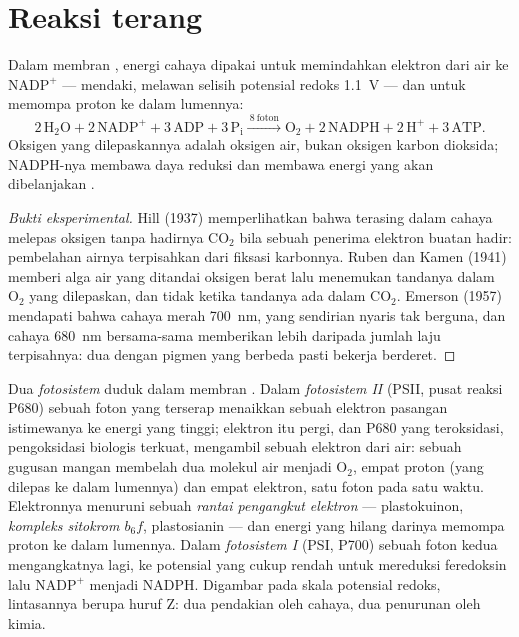 \section{Reaksi terang}

\begin{proposition}\label{prop:b1:photosynthesis:lightreactions}
Dalam membran , energi cahaya dipakai untuk memindahkan elektron
dari air ke $\mathrm{NADP^+}$ --- mendaki, melawan selisih potensial
redoks \qty{1.1}{V} --- dan untuk memompa proton ke dalam lumennya:
\[
2\,\mathrm{H_2O} + 2\,\mathrm{NADP^+} + 3\,\mathrm{ADP} + 3\,\mathrm{P_i}
\xrightarrow{\ 8\ \text{foton}\ }
\mathrm{O_2} + 2\,\mathrm{NADPH} + 2\,\mathrm{H^+} + 3\,\mathrm{ATP} .
\]
Oksigen yang dilepaskannya adalah oksigen air, bukan oksigen karbon
dioksida; NADPH-nya membawa daya reduksi dan  membawa energi
yang akan dibelanjakan .
\end{proposition}
\begin{proof}[Bukti eksperimental]
Hill (1937) memperlihatkan bahwa  terasing dalam cahaya
melepas oksigen tanpa hadirnya $\mathrm{CO_2}$ bila sebuah penerima
elektron buatan hadir: pembelahan airnya terpisahkan dari fiksasi
karbonnya. Ruben dan Kamen (1941) memberi alga air yang ditandai
oksigen berat lalu menemukan tandanya dalam $\mathrm{O_2}$ yang
dilepaskan, dan tidak ketika tandanya ada dalam $\mathrm{CO_2}$.
Emerson (1957) mendapati bahwa cahaya merah \qty{700}{nm}, yang
sendirian nyaris tak berguna, dan cahaya \qty{680}{nm} bersama-sama
memberikan lebih daripada jumlah laju terpisahnya: dua 
dengan pigmen yang berbeda pasti bekerja berderet.
\end{proof}

\begin{definition}\label{def:b1:photosynthesis:zscheme}
Dua \emph{fotosistem} duduk dalam membran . Dalam
\emph{fotosistem II} (PSII, pusat reaksi P680) sebuah foton yang
terserap menaikkan sebuah elektron pasangan istimewanya ke energi yang
tinggi; elektron itu pergi, dan P680 yang teroksidasi, pengoksidasi
biologis terkuat, mengambil sebuah elektron dari air: sebuah gugusan
mangan membelah dua molekul air menjadi $\mathrm{O_2}$, empat proton
(yang dilepas ke dalam lumennya) dan empat elektron, satu foton pada
satu waktu. Elektronnya menuruni sebuah \emph{rantai pengangkut
elektron} --- plastokuinon, \emph{kompleks sitokrom $b_6f$},
plastosianin --- dan energi yang hilang darinya memompa proton ke dalam
lumennya. Dalam \emph{fotosistem I} (PSI, P700) sebuah foton kedua
mengangkatnya lagi, ke potensial yang cukup rendah untuk mereduksi
feredoksin lalu $\mathrm{NADP^+}$ menjadi NADPH. Digambar pada skala
potensial redoks, lintasannya berupa huruf Z: dua pendakian oleh
cahaya, dua penurunan oleh kimia.
\end{definition}

